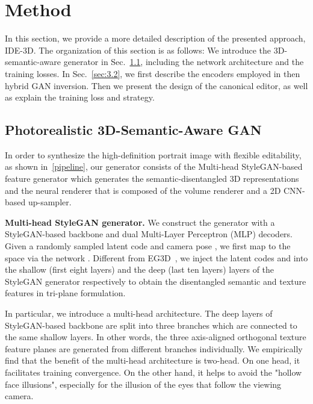 \documentclass[acmtog]{acmart}
\begin{document}
\section{Method}




In this section, we provide a more detailed description of the presented approach, IDE-3D. The organization of this section is as follows: We introduce the 3D-semantic-aware generator in Sec.~\ref{sec:3.1}, including the network architecture and the training losses. In Sec.~\ref{sec:3.2}, we first describe the encoders employed in then hybrid GAN inversion. Then we present the design of the canonical editor, as well as explain the training loss and strategy. 




\subsection{Photorealistic 3D-Semantic-Aware GAN}
\label{sec:3.1}

In order to synthesize the high-definition portrait image with flexible editability, as shown in~\ref{pipeline}, our generator consists of the Multi-head StyleGAN-based feature generator which generates the semantic-disentangled 3D representations and the neural renderer that is composed of the volume renderer and a 2D CNN-based up-sampler.



\noindent \textbf{Multi-head StyleGAN generator.} 
We construct the generator with a StyleGAN-based backbone and dual Multi-Layer Perceptron (MLP) decoders.
Given a randomly sampled latent code  and camera pose , we first map  to the  space via the network . Different from EG3D~\citet{eg3d}, we inject the latent codes  and  into the shallow (first eight layers) and the deep (last ten layers) layers of the StyleGAN generator  respectively to obtain the disentangled semantic  and texture  features in tri-plane formulation.



In particular, we introduce a multi-head architecture. The deep layers of StyleGAN-based backbone are split into three branches which are connected to the same shallow layers. In other words, the three axis-aligned orthogonal texture feature planes  are generated from different branches individually. We empirically find that the benefit of the multi-head architecture is two-head. On one head, it facilitates training convergence. On the other hand, it helps to avoid the "hollow face illusions", especially for the illusion of the eyes that follow the viewing camera.
\end{document}
